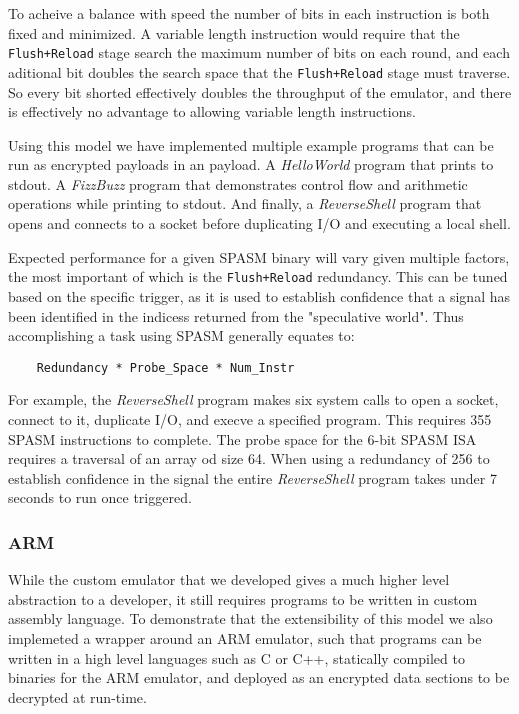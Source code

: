 To acheive a balance with speed the number of bits in each instruction is both 
fixed and minimized.  A variable length instruction would require that the 
\texttt{Flush+Reload} stage search the maximum number of bits on each round, and each 
aditional bit doubles the search space that the \texttt{Flush+Reload} stage must 
traverse.  So every bit shorted effectively doubles the throughput of the 
emulator, and there is effectively no advantage to allowing variable length 
instructions. 

Using this model we have implemented multiple example programs that can be run
as encrypted payloads in an \speculake payload. A \textit{HelloWorld} program 
that prints to stdout. A \textit{FizzBuzz} program that demonstrates control 
flow and arithmetic operations while printing to stdout. And finally,
a \textit{ReverseShell} program that opens and connects to a socket before  
duplicating I/O and executing a local shell. 

Expected performance for a given SPASM binary will vary given multiple factors, 
the most important of which is the \texttt{Flush+Reload} redundancy. This can be tuned
based on the specific trigger, as it is used to establish confidence that a signal 
has been identified in the indicess returned from the "speculative world". 
Thus accomplishing a task using SPASM generally equates to:

\begin{lstlisting}
    Redundancy * Probe_Space * Num_Instr
\end{lstlisting}

For example, the \textit{ReverseShell} program makes six system calls to open a socket,
connect to it, duplicate I/O, and execve a specified program. This requires 355
SPASM instructions to complete. The probe space for the 6-bit SPASM ISA requires 
a traversal of an array od size 64. When using a redundancy of 256 to establish
confidence in the signal the entire \textit{ReverseShell} program takes under 7 
seconds to run once triggered. 

\FigSpasmModel

\subsubsection{ARM}
\label{subsubsec:arm}
While the custom emulator that we developed gives a much higher level abstraction to 
a developer, it still requires programs to be written in custom assembly 
language. To demonstrate that the extensibility of this model we also implemeted a wrapper
around an ARM emulator, such that programs can be written in a high level languages 
such as C or C++, statically compiled to binaries for the ARM emulator, and deployed 
as an encrypted data sections to be decrypted at run-time.  



